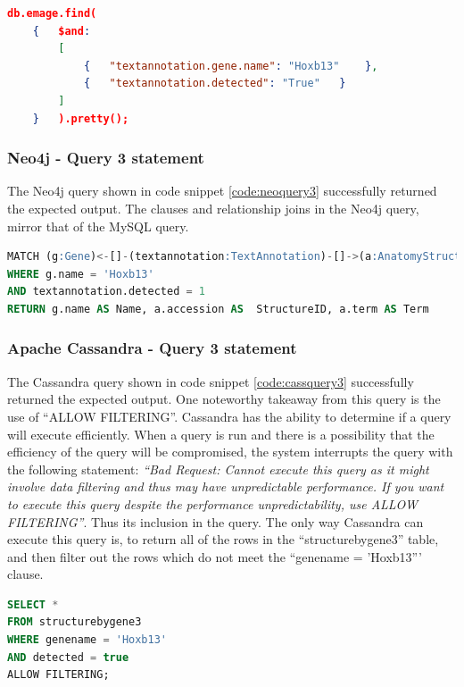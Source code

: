 \begin{lstlisting}[language=json, caption=MongoDB query 3 statement. Where is gene X expressed?., label=code:mongoquery3]
db.emage.find(
	{	$and:
		[
			{	"textannotation.gene.name": "Hoxb13"	},
			{	"textannotation.detected": "True"	}
		]
	}	).pretty();
\end{lstlisting}

\subsubsection*{Neo4j - Query 3 statement}\label{neoquery3statement}
The Neo4j query shown in code snippet \ref{code:neoquery3} successfully returned the expected output. The clauses and relationship joins in the Neo4j query, mirror that of the MySQL query.

\begin{lstlisting}[language=SQL, caption=Neo4j query 3 statement. Where is gene X expressed?., label=code:neoquery3]
MATCH (g:Gene)<-[]-(textannotation:TextAnnotation)-[]->(a:AnatomyStructure)
WHERE g.name = 'Hoxb13'
AND textannotation.detected = 1
RETURN g.name AS Name, a.accession AS  StructureID, a.term AS Term
\end{lstlisting}

\subsubsection*{Apache Cassandra - Query 3 statement}\label{cassquery3statement}
The Cassandra query shown in code snippet \ref{code:cassquery3} successfully returned the expected output. One noteworthy takeaway from this query is the use of ``ALLOW FILTERING''. Cassandra has the ability to determine if a query will execute efficiently. When a query is run and there is a possibility that the efficiency of the query will be compromised, the system interrupts the query with the following statement: \textit{``Bad Request: Cannot execute this query as it might involve data filtering and thus may have unpredictable performance. If you want to execute this query despite the performance unpredictability, use ALLOW FILTERING''}. Thus its inclusion in the query. The only way Cassandra can execute this query is, to return all of the rows in the ``structurebygene3'' table, and then filter out the rows which do not meet the ``genename = 'Hoxb13''' clause. 

\begin{lstlisting}[language=SQL, caption=Cassandra query 3 statement. Where is gene X expressed?., label=code:cassquery3]
SELECT *
FROM structurebygene3
WHERE genename = 'Hoxb13'
AND detected = true
ALLOW FILTERING;
\end{lstlisting}


